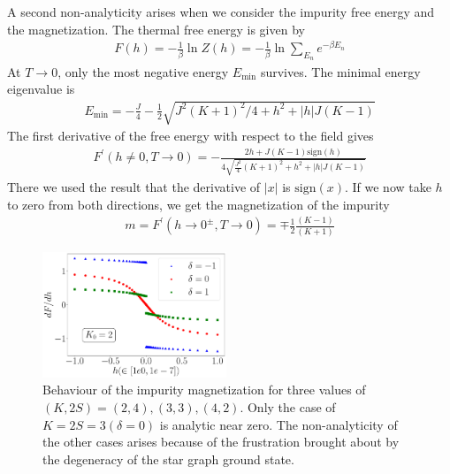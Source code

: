\documentclass[reprint,prb,superscriptaddress]{revtex4-1}
\begin{document}
A second non-analyticity arises when we consider the impurity free energy and the magnetization. The thermal free energy is given by
\begin{equation}\begin{aligned}
	F(h) = -\frac{1}{\beta}\ln Z(h) = -\frac{1}{\beta}\ln\sum_{E_n}e^{-\beta E_n}
\end{aligned}\end{equation}
At \(T \to 0\), only the most negative energy \(E_\text{min}\) survives. The minimal energy eigenvalue is
\begin{equation}\begin{aligned}
	E_\text{min} = - \frac{J}{4} - \frac{1}{2}\sqrt{J^2(K+1)^2/4 + h^2 + |h|J(K-1)}
\end{aligned}\end{equation}
The first derivative of the free energy with respect to the field gives
\begin{equation}\begin{aligned}
	F^\prime(h\neq 0, T\to 0) =- \frac{2h + J(K-1)\text{sign}(h)}{4\sqrt{\frac{J^2}{4}(K+1)^2 + h^2 + |h|J(K-1)}}
\end{aligned}\end{equation}
There we used the result that the derivative of \(|x|\) is \(\text{sign}(x)\). If we now take \(h\) to zero from both directions, we get the magnetization of the impurity
\begin{equation}\begin{aligned}
	m = F^\prime(h \to 0^\pm, T\to 0) = \mp \frac{1}{2}\frac{(K-1)}{(K+1)}
\end{aligned}\end{equation}
\begin{figure}[!htpb]
	\centering
	\includegraphics[width=0.49\textwidth]{plt/disc_mag_imp_gen.pdf}
	\caption{Behaviour of the impurity magnetization for three values of \(\left(K, 2S\right) = \left(2, 4\right), \left( 3,3 \right), \left(4, 2\right)  \). Only the case of \(K=2S=3 \left(\delta=0\right)\) is analytic near zero. The non-analyticity of the other cases arises because of the frustration brought about by the degeneracy of the star graph ground state.}
	\label{mag_crit}
\end{figure}
\end{document}

